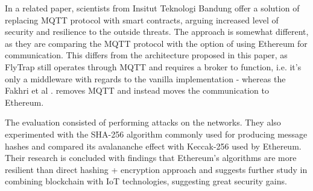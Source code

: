 In a related paper, scientists from Insitut Teknologi Bandung \citep{fakhri2018secure} offer a solution of replacing MQTT protocol with smart contracts, arguing increased level of security and resilience to the outside threats. The approach is somewhat different, as they are comparing the MQTT protocol with the option of using Ethereum for communication. This differs from the architecture proposed in this paper, as FlyTrap still operates through MQTT and requires a broker to function, i.e. it's only a middleware with regards to the vanilla implementation - whereas the Fakhri et al \cite{fakhri2018secure}. removes MQTT and instead moves the communication to Ethereum.

The evaluation consisted of performing attacks on the networks. They also experimented with the SHA-256 \cite{gilbert2003security} algorithm commonly used for producing message hashes and compared its avalananche effect with Keccak-256 used by Ethereum. Their research is concluded with findings that Ethereum's algorithms are more resilient than direct hashing + encryption approach and suggests further study in combining blockchain with IoT technologies, suggesting great security gains.
